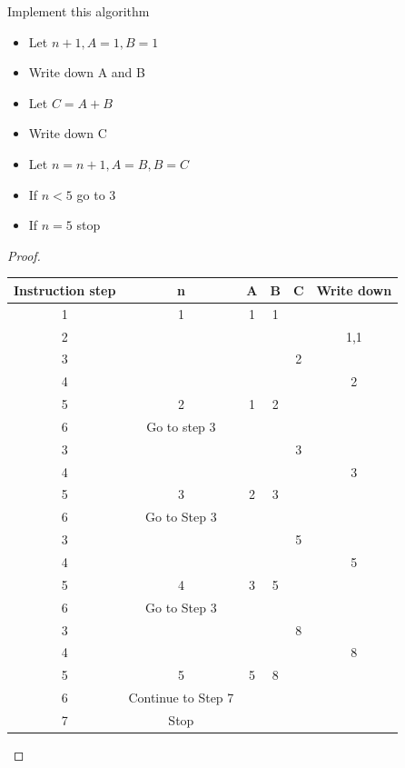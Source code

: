 \documentclass[a4paper]{article}
\begin{document}
\begin{eg}
Implement this algorithm
\begin{itemize}
\item Let $n+1,A=1,B=1$ 
\item Write down A and B
\item Let $ C=A+B$
\item Write down C
\item Let $n=n+1,A=B,B=C$
\item If $n<5$ go to 3
\item If $n=5$ stop
\end{itemize}
\begin{proof}
\begin{centering}
\begin{tabular}{|c|c|c|c|c|c|}
\hline
Instruction step & n & A & B & C & Write down\\
\hline
1 & 1 & 1& 1 & & \\
\hline
2 & & & &  & 1,1 \\
\hline
3 & & & & 2& \\
\hline
4 & & & & &2 \\
\hline
5 & 2& 1& 2& & \\
\hline
6 & Go to step 3& \\
\hline
3 & & & &3 & \\
\hline
4 & & & & & 3\\
\hline
5 &3 &2 & 3& & \\
\hline
6 &Go to Step 3 \\
\hline
3 & & & & 5& \\
\hline
4 & & & & & 5\\
\hline
5 &4 &3 & 5& & \\
\hline
6 & Go to Step 3 \\
\hline
3 & & & &8 & \\
\hline
4 & & & & &8 \\
\hline
5 &5 & 5& 8& & \\
\hline
6 &Continue to Step 7\\
\hline
7 & Stop\\
\hline
\end{tabular}
\end{centering}
\end{proof}
\end{eg}
\end{document}
